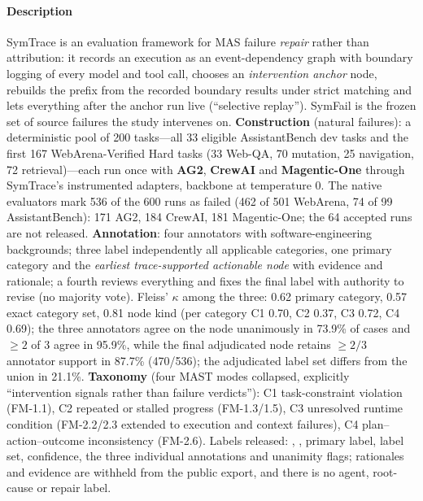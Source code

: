 \paragraph{Description} SymTrace is an evaluation framework for MAS failure \emph{repair} rather than attribution: it records an execution as an event-dependency graph with boundary logging of every model and tool call, chooses an \emph{intervention anchor} node, rebuilds the prefix from the recorded boundary results under strict matching and lets everything after the anchor run live (``selective replay''). SymFail is the frozen set of source failures the study intervenes on. \textbf{Construction} (natural failures): a deterministic pool of 200 tasks---all 33 eligible AssistantBench dev tasks and the first 167 WebArena-Verified Hard tasks (33 Web-QA, 70 mutation, 25 navigation, 72 retrieval)---each run once with \textbf{AG2}, \textbf{CrewAI} and \textbf{Magentic-One} through SymTrace's instrumented adapters, backbone  at temperature 0. The native evaluators mark 536 of the 600 runs as failed (462 of 501 WebArena, 74 of 99 AssistantBench): 171 AG2, 184 CrewAI, 181 Magentic-One; the 64 accepted runs are not released. \textbf{Annotation}: four annotators with software-engineering backgrounds; three label independently all applicable categories, one primary category and the \emph{earliest trace-supported actionable node} with evidence and rationale; a fourth reviews everything and fixes the final label with authority to revise (no majority vote). Fleiss' $\kappa$ among the three: 0.62 primary category, 0.57 exact category set, 0.81 node kind (per category C1 0.70, C2 0.37, C3 0.72, C4 0.69); the three annotators agree on the node unanimously in 73.9\% of cases and $\ge 2$ of 3 agree in 95.9\%, while the final adjudicated node retains $\ge 2/3$ annotator support in 87.7\% (470/536); the adjudicated label set differs from the union in 21.1\%. \textbf{Taxonomy} (four MAST modes collapsed, explicitly ``intervention signals rather than failure verdicts''): C1 task-constraint violation (FM-1.1), C2 repeated or stalled progress (FM-1.3/1.5), C3 unresolved runtime condition (FM-2.2/2.3 extended to execution and context failures), C4 plan--action--outcome inconsistency (FM-2.6). Labels released: , , primary label, label set, confidence, the three individual annotations and unanimity flags; rationales and evidence are withheld from the public export, and there is no agent, root-cause or repair label.

